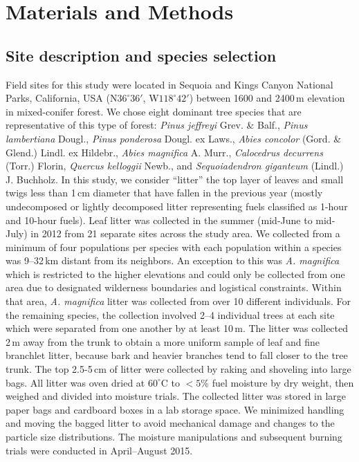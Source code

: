 \documentclass[letterpaper,12pt]{article}
\begin{document}
\section*{Materials and Methods}

\subsection*{Site description and species selection}

Field sites for this study were located in Sequoia and Kings Canyon National
Parks, California, USA (N$36^\circ 36'$, W$118^\circ 42'$) between 1600 and
2400\,m elevation in mixed-conifer forest. We chose eight dominant tree species
that are representative of this type of forest: \emph{Pinus jeffreyi} Grev. \&
Balf., \emph{Pinus lambertiana} Dougl., \emph{Pinus ponderosa} Dougl. ex Laws.,
\emph{Abies concolor} (Gord. \& Glend.) Lindl. ex Hildebr., \emph{Abies
  magnifica} A. Murr., \emph{Calocedrus decurrens} (Torr.) Florin,
\emph{Quercus kelloggii} Newb., and \emph{Sequoiadendron giganteum} (Lindl.) J.
Buchholz. In this study, we consider ``litter'' the top layer of leaves and small
twigs less than 1\,cm diameter that have fallen in the previous year (mostly
undecomposed or lightly decomposed litter representing fuels classified as
1-hour and 10-hour fuels). Leaf litter was collected in the summer (mid-June to
mid-July) in 2012 from 21 separate sites across the study area. We collected
from a minimum of four populations per species with each population within a
species was 9--32\,km distant from its neighbors. An exception to this was
\emph{A. magnifica} which is restricted to the higher elevations and could only
be collected from one area due to designated wilderness boundaries and
logistical constraints. Within that area, \emph{A. magnifica} litter was
collected from over 10 different individuals. For the remaining species, the
collection involved 2--4 individual trees at each site which were separated
from one another by at least 10\,m. The litter was collected 2\,m away from the
trunk to obtain a more uniform sample of leaf and fine branchlet litter,
because bark and heavier branches tend to fall closer to the tree trunk. The
top 2.5-5\,cm of litter were collected by raking and shoveling into large bags.
All litter was oven dried at $60^\circ$C to $< 5$\% fuel moisture by dry
weight, then weighed and divided into moisture trials. The collected litter was
stored in large paper bags and cardboard boxes in a lab storage space. We
minimized handling and moving the bagged litter to avoid mechanical damage and
changes to the particle size distributions. The moisture manipulations and
subsequent burning trials were conducted in April--August 2015.
\end{document}
